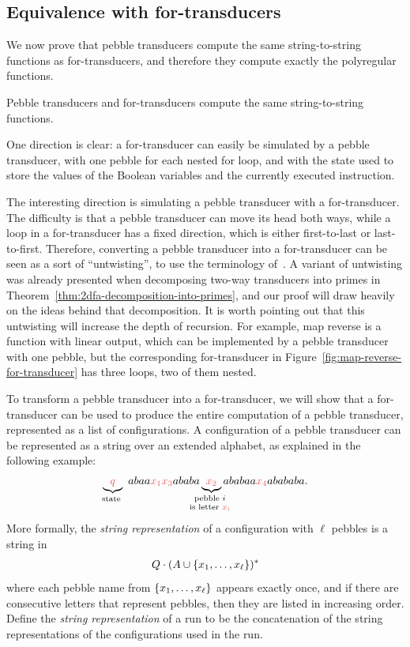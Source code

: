 \subsection{Equivalence with for-transducers} 
We now prove that pebble transducers compute the same string-to-string functions as for-transducers, and therefore they compute exactly the polyregular functions.


\begin{theorem}\label{thm:pebble-are-for}
   Pebble transducers and for-transducers compute the same string-to-string functions.
\end{theorem}

One direction is clear: a for-transducer can easily be simulated by a pebble transducer, with one pebble for each nested for loop, and with the state used to store the values of the Boolean variables and the currently executed instruction. 

The interesting direction is simulating a pebble transducer with a for-transducer.
The difficulty is that a pebble transducer can move its head both ways, while a loop in a for-transducer has a fixed direction, which is either first-to-last or last-to-first.  Therefore, converting a pebble transducer into a for-transducer can be seen as a sort of ``untwisting'', to use the terminology of~\cite{baschenis2017}. A variant of untwisting was already presented when decomposing two-way transducers into primes in Theorem~\ref{thm:2dfa-decomposition-into-primes}, and our proof will draw heavily on the ideas behind that decomposition. It is worth pointing out that this untwisting will increase the depth of recursion. For example, map reverse is a function with linear output, which can be implemented by a pebble transducer with one pebble, but the corresponding for-transducer in Figure~\ref{fig:map-reverse-for-transducer} has three loops, two of them nested.




To transform a pebble transducer into a for-transducer, we will show that a for-transducer can be used to produce the entire computation of a pebble transducer, represented as a list of configurations.
A configuration of a pebble transducer can be represented as a string over an extended alphabet, as explained in the following example:
\begin{align*}
\myunderbrace{\red q}{state}\ abaa \red{x_1 x_3} ababa \myunderbrace{\red{x_2}}{pebble $i$ \\ is letter $\red{x_i}$} ababaa \red{x_4} abababa.
\end{align*}
More formally, the \emph{string representation} of a configuration with $\ell$ pebbles is a string in 
\begin{align*}
Q \cdot (A \cup \{x_1,\ldots,x_\ell\})^*
\end{align*}
where each pebble name from $\{x_1,\ldots,x_\ell\}$ appears exactly once, and if there are consecutive letters that represent pebbles, then they are listed in increasing order. Define the \emph{string representation} of a run to be the concatenation of the string representations of the configurations used in the run. 

